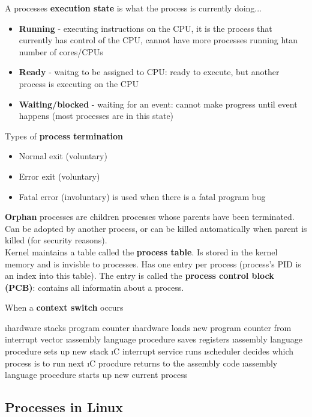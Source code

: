\documentclass{article}
\begin{document}
    \noindent A processes \textbf{execution state} is what the process is currently doing...

    \begin{itemize}
    \item \textbf{Running} - executing instructions on the CPU, it is the process that currently has control of the CPU, cannot have more processes running htan number of cores/CPUs
    \item \textbf{Ready} - waitng to be assigned to CPU: ready to execute, but another process is executing on the CPU
    \item \textbf{Waiting/blocked} - waiting for an event: cannot make progress until event happens (most processes are in this state)
    \end{itemize}

    \noindent Types of \textbf{process termination}
    \begin{itemize}
    \item Normal exit (voluntary)
    \item Error exit (voluntary)
    \item Fatal error (involuntary) is used when there is a fatal program bug
    \end{itemize}

    \noindent \textbf{Orphan} processes are children processes whose parents have been terminated. Can be adopted by another process, or can be killed automatically when parent is killed (for security reasons). \\

    \noindent Kernel maintains a table called the \textbf{process table}. Is stored in the kernel memory and is invisble to processes. Has one entry per process (process's PID is an index into this table). The entry is called the \textbf{process control block (PCB)}: contains all informatin about a process. 

    \noindent When a \textbf{context switch} occurs
    
    \bl
    \i hardware stacks program counter
    \i hardware loads new program counter from interrupt vector
    \i assembly language procedure saves registers 
    \i assembly language procedure sets up new stack
    \i C interrupt service runs
    \i scheduler decides which process is to run next
    \i C procdure returns to the assembly code
    \i assembly language procedure starts up new current process
    \el

\subsection{Processes in Linux}
\end{document}
